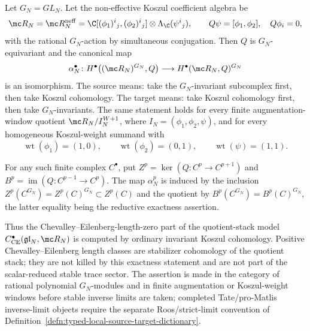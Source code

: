 \documentclass[11pt]{memoir}
\begin{document}
\begin{lem}
\label{lem:reductive-invariants-koszul-exactness}
  Let \(G_N=GL_N\).  Let the non-effective Koszul coefficient algebra be
  \[
      \mc R_N=\mc R_N^{\mathrm{neff}}=
      \C[(\phi_1)^i{}_j,(\phi_2)^i{}_j]
      \otimes\Lambda_\C(\psi^i{}_j),
      \qquad Q\psi=[\phi_1,\phi_2],\quad Q\phi_i=0,
  \]
  with the rational \(G_N\)-action by simultaneous conjugation.  Then
  \(Q\) is \(G_N\)-equivariant and the canonical map
  \[
    \alpha_N^\bullet\colon
    H^\bullet\bigl((\mc R_N)^{G_N},Q\bigr)
    \longrightarrow
    H^\bullet(\mc R_N,Q)^{G_N}
  \]
  is an isomorphism.  The source means: take the \(G_N\)-invariant
  subcomplex first, then take Koszul cohomology.  The target means: take
  Koszul cohomology first, then take \(G_N\)-invariants.  The same
  statement holds for every finite augmentation-window quotient
  \(\mc R_N/I_N^{W+1}\), where
  \(I_N=(\phi_1,\phi_2,\psi)\), and for every homogeneous
  Koszul-weight summand with
  \[
    \operatorname{wt}(\phi_1)=(1,0),\qquad
    \operatorname{wt}(\phi_2)=(0,1),\qquad
    \operatorname{wt}(\psi)=(1,1).
  \]

  For any such finite complex \(C^\bullet\), put
  \(Z^p=\ker(Q\colon C^p\to C^{p+1})\) and
  \(B^p=\operatorname{im}(Q\colon C^{p-1}\to C^p)\).  The map
  \(\alpha_N^p\) is induced by the inclusion
  \(Z^p(C^{G_N})=Z^p(C)^{G_N}\subset Z^p(C)\) and the quotient by
  \(B^p(C^{G_N})=B^p(C)^{G_N}\), the latter equality being the
  reductive exactness assertion.

  Thus the Chevalley--Eilenberg-length-zero part of the quotient-stack
  model \(C^\bullet_{\mathrm{CE}}(\mathfrak{gl}_N,\mc R_N)\) is
  computed by ordinary invariant Koszul cohomology.  Positive
  Chevalley--Eilenberg length classes are stabilizer cohomology of the
  quotient stack; they are not killed by this exactness statement and
  are not part of the scalar-reduced stable trace sector.  The assertion
  is made in the category of rational polynomial \(G_N\)-modules and in
  finite augmentation or Koszul-weight windows before stable inverse
  limits are taken; completed Tate/pro-Matlis inverse-limit objects
  require the separate Roos/strict-limit convention of
  Definition~\ref{defn:typed-local-source-target-dictionary}.
\end{lem}
\end{document}
